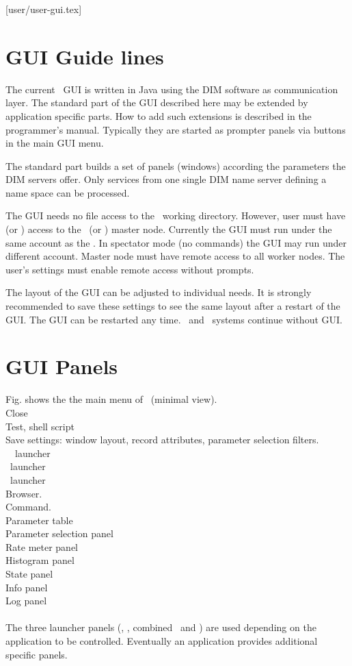 [user/user-gui.tex]
\section{GUI Guide lines}
The current \dabc\ GUI is written in Java using the DIM software as communication layer.
The standard part of the GUI described here may be extended by application specific parts.
How to add such extensions is described in the programmer's manual.
Typically they are started as prompter panels via buttons in the
main GUI menu.

The standard part builds a set of panels (windows) according the parameters
the DIM servers offer. Only services from one single DIM name server
defining a name space can be processed.

The GUI needs no file access to the \dabc\ working directory.
However, user must have  (or ) access to
the \dabc\ (or \mbs) master node.
Currently the GUI must run under the same account as the \dabc.
In spectator mode (no commands) the GUI may run under different account.
Master node must have remote access to all worker nodes.
The user's  settings must enable remote access without
prompts.

The layout of the GUI can be adjusted to individual needs.
It is strongly recommended to save these settings to see the same layout
after a restart of the GUI. The GUI can be restarted any time.
\dabc\ and \mbs\ systems continue without GUI.
\section{GUI Panels}
Fig.  shows the the main menu of \dabc\ (minimal view).\\
 Close\\
 Test, shell script\\
 Save settings: window layout, record attributes, parameter selection filters.\\
 \dabc\ \mbs\ launcher\\
 \dabc\ launcher\\
 \mbs\ launcher\\
  Browser.\\
 Command.\\
 Parameter table\\
 Parameter selection panel\\
 Rate meter panel\\
 Histogram panel\\
 State panel\\
 Info panel\\
 Log panel\\\\
The three launcher panels (\dabc, \mbs, combined \dabc\ and \mbs) 
are used depending on the
application to be controlled. Eventually an application provides 
additional specific panels.
